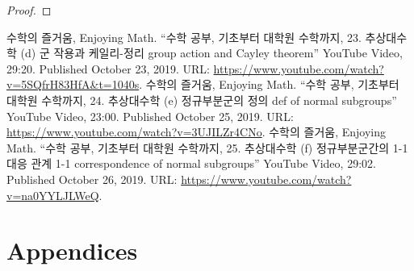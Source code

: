 \documentclass[11pt,openany]{article}
\begin{document}
\begin{proof}
\end{proof}


\vfill
\begin{thebibliography}{9}
	수학의 즐거움, Enjoying Math. ``수학 공부, 기초부터 대학원 수학까지, 23. 추상대수학 (d) 군 작용과 케일리-정리 group action and Cayley theorem'' YouTube Video, 29:20. Published 
	October 23, 2019. URL: \url{https://www.youtube.com/watch?v=5SQfrH83HfA&t=1040s}.
	수학의 즐거움, Enjoying Math. ``수학 공부, 기초부터 대학원 수학까지, 24. 추상대수학 (e) 정규부분군의 정의 def of normal subgroups'' YouTube Video, 23:00. Published 
	October 25, 2019. URL: \url{https://www.youtube.com/watch?v=3UJILZr4CNo}.
	수학의 즐거움, Enjoying Math. ``수학 공부, 기초부터 대학원 수학까지, 25. 추상대수학 (f) 정규부분군간의 1-1 대응 관계 1-1 correspondence of normal subgroups'' YouTube Video, 29:02. Published 
	October 26, 2019. URL: \url{https://www.youtube.com/watch?v=na0YYLJLWeQ}.
\end{thebibliography}

\newpage
\appendix
\section{Appendices}
\end{document}
